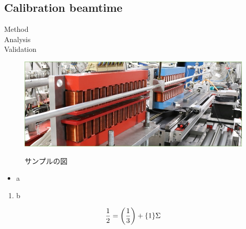 \documentclass[a4paper,11pt,uplatex]{jsarticle}
\begin{document}
\subsection{Calibration beamtime}
Method\\
Analysis\\
Validation\\

\clearpage

\begin{figure}[tb]
  \centering
  \includegraphics[width=0.8\linewidth]{image/1-1.jpg}\\
  \caption{サンプルの図}
  \label{sample_image}
\end{figure}

\begin{itemize}
  \item a
\end{itemize}
\begin{enumerate}
  \item b
\end{enumerate}

\begin{align}
\frac{1}{2} = \qty(\frac{1}{3}) + \qty{1}\Sigma
\end{align}
\end{document}
